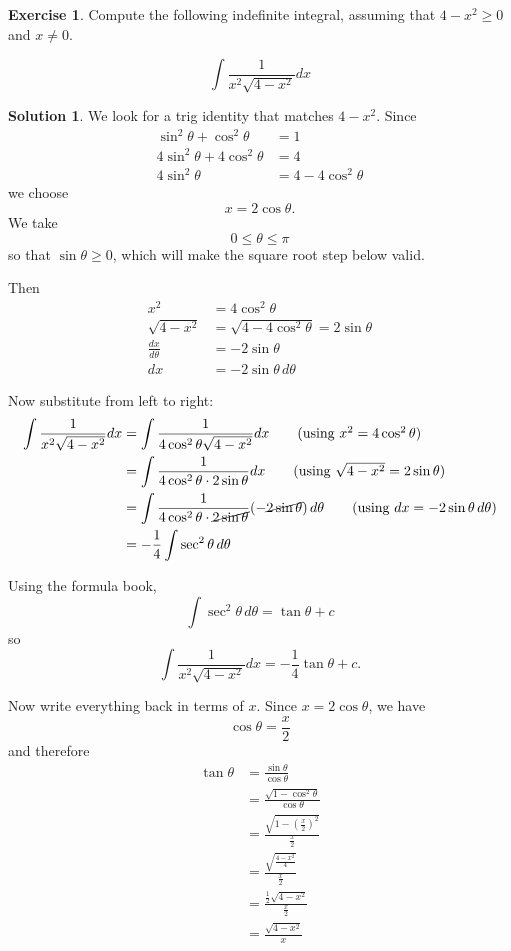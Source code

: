 \documentclass[a4paper]{article}
\theoremstyle{plain}
\theoremstyle{definition}
\newtheorem*{solution}{Solution}
\newtheorem{exercise}{Exercise}
\numberwithin{equation}{subsection}
\begin{document}

\begin{exercise}
Compute the following indefinite integral, assuming that $4-x^2\geq 0$ and $x\neq0$.

\[
    \int \frac{1}{x^2 \sqrt{4 - x^2}}dx
\]
\end{exercise}

\begin{solution}

We look for a trig identity that matches $4-x^2$. Since
\begin{align*}
    \sin^2\theta + \cos^2\theta &= 1\\
    4\sin^2\theta + 4\cos^2\theta &= 4\\
    4\sin^2\theta &= 4 - 4\cos^2\theta
\end{align*}
we choose
\[
    x = 2\cos\theta.
\]
We take
\[
    0 \leq \theta \leq \pi
\]
so that $\sin\theta \geq 0$, which will make the square root step below valid.

Then
\begin{align*}
    x^2 &= 4\cos^2\theta\\
    \sqrt{4-x^2} &= \sqrt{4-4\cos^2\theta} = 2\sin\theta\\
    \frac{dx}{d\theta} &= -2\sin\theta\\
    dx &= -2\sin\theta\,d\theta
\end{align*}

Now substitute from left to right:
\begin{align*}
    \int \frac{1}{x^2 \sqrt{4 - x^2}}dx
    &= \int \frac{1}{4\cos^2\theta\sqrt{4-x^2}}dx \tag{using $x^2 = 4\cos^2\theta$}\\
    &= \int \frac{1}{4\cos^2\theta \cdot 2\sin\theta}dx \tag{using $\sqrt{4-x^2} = 2\sin\theta$}\\
    &= \int \frac{1}{4\cos^2\theta \cdot \cancel{2\sin\theta}}(-\cancel{2\sin\theta})\,d\theta \tag{using $dx = -2\sin\theta\,d\theta$}\\
    &= -\frac{1}{4}\int \sec^2\theta\,d\theta
\end{align*}

Using the formula book,
\[
    \int \sec^2\theta\,d\theta = \tan\theta + c
\]
so
\[
    \int \frac{1}{x^2 \sqrt{4 - x^2}}dx = -\frac{1}{4}\tan\theta + c.
\]

Now write everything back in terms of $x$. Since $x = 2\cos\theta$, we have
\[
    \cos\theta = \frac{x}{2}
\]
and therefore
\begin{align*}
    \tan\theta
    &= \frac{\sin\theta}{\cos\theta}\\
    &= \frac{\sqrt{1-\cos^2\theta}}{\cos\theta}\\
    &= \frac{\sqrt{1-\left(\frac{x}{2}\right)^2}}{\frac{x}{2}}\\
    &= \frac{\sqrt{\frac{4-x^2}{4}}}{\frac{x}{2}}\\
    &= \frac{\frac{1}{2}\sqrt{4-x^2}}{\frac{x}{2}}\\
    &= \frac{\sqrt{4-x^2}}{x}
\end{align*}


\end{solution}
\end{document}
